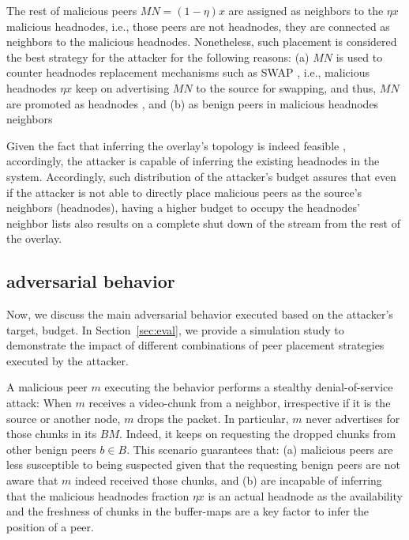 The rest of malicious peers $MN=(1-\eta) x$ are assigned as neighbors to the $\eta x$ malicious headnodes, i.e., those peers are not headnodes, they are connected as neighbors to the malicious headnodes. 
Nonetheless, such placement is considered the best strategy for the attacker for the following reasons: (a) $MN$ is used to counter headnodes replacement mechanisms such as SWAP \cite{nguyen2016swap}, i.e., malicious headnodes $\eta x$ keep on advertising $MN$ to the source for swapping, and thus, $MN$ are promoted as headnodes
, and (b) as benign peers in malicious headnodes neighbors 


Given the fact that inferring the overlay's topology is indeed feasible \cite{nguyen2016swap,rbcs}, accordingly, the attacker is capable of inferring the existing headnodes in the system.
Accordingly, such distribution of the attacker's budget assures that even if the attacker is not able to directly place malicious peers as the source's neighbors (headnodes), having a higher budget to occupy the headnodes' neighbor lists also results on a complete shut down of the stream from the rest of the overlay.

\subsection{\drop adversarial behavior}
Now, we discuss the main adversarial behavior executed based on the attacker's target, budget. 
In Section~\ref{sec:eval}, we provide a simulation study to demonstrate the impact of different combinations of peer placement strategies executed by the attacker. 


A malicious peer $m$ executing the \drop behavior performs a stealthy denial-of-service attack: 
When $m$ receives a video-chunk from a neighbor, irrespective if it is the source or another node, $m$ drops the packet. 
In particular, $m$ never advertises for those chunks in its $BM$.
Indeed, it keeps on requesting the dropped chunks from other benign peers $b \in B$.
This scenario guarantees that: (a) malicious peers are less susceptible to being suspected given that the requesting benign peers are not aware that $m$ indeed received those chunks,
and (b) are incapable of inferring that the malicious headnodes fraction $\eta x$ is an actual headnode as the availability and the freshness of chunks in the buffer-maps are a key factor to infer the position of a peer. 

